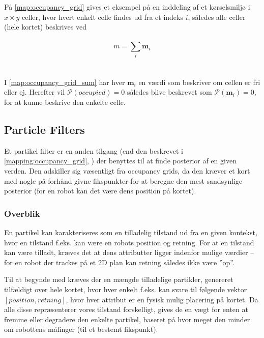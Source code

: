 På \cref{map:occupancy_grid} gives et eksempel på en inddeling af et kørselsmiljø i $x \times y$ celler, hvor hvert enkelt celle findes ud fra et indeks $i$, således alle celler (hele kortet) beskrives ved
\\\\
\begin{equation}\label{map:occupancy_grid_sum}
m = \sum\limits_{i} \mathbf{m}_{i}
\end{equation}
\\\\
I \cref{map:occupancy_grid_sum} har hver $\mathbf{m}_i$ en værdi som beskriver om cellen er fri eller ej.
Herefter vil $\mathcal{P}(occupied) = 0$ således blive beskrevet som $\mathcal{P}(\mathbf{m}_i) = 0$, for at kunne beskrive den enkelte celle.

\subsection{Particle Filters}\label{mapping:particle_filter}
Et partikel filter er en anden tilgang (end den beskrevet i \cref{mapping:occupancy_grid}, ) der benyttes til at finde posterior af en given verden. 
Den adskiller sig væsentligt fra occupancy grids, da den kræver et kort med nogle på forhånd givne fikspunkter for at beregne den mest sandsynlige posterior (for en robot kan det være dens position på kortet).

\subsubsection{Overblik}
En partikel kan karakteriseres som en tilladelig tilstand ud fra en given kontekst, hvor en tilstand f.eks. kan være en robots position og retning.
For at en tilstand kan være tilladt, kræves det at dens attributter ligger indenfor mulige værdier -- for en robot der trackes på et 2D plan kan retning således ikke være ''op''.

Til at begynde med kræves der en mængde tilladelige partikler, genereret tilfældigt over hele kortet, hvor hver enkelt f.eks. kan svare til følgende vektor $[\mathit{position}, \mathit{retning}]$, hvor hver attribut er en fysisk mulig placering på kortet.
Da alle disse repræsenterer vores tilstand forskelligt, gives de en vægt for enten at fremme eller degradere den enkelte partikel, baseret på hvor meget den 
minder om robottens målinger (til et bestemt fikspunkt).

